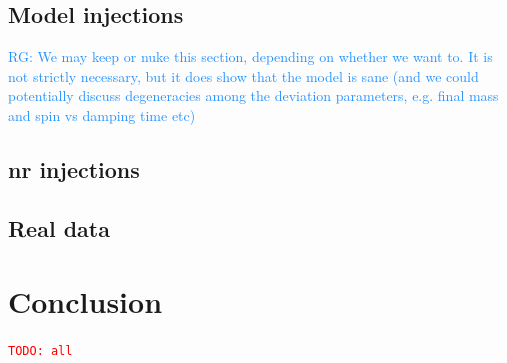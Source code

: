 \documentclass[prd,amssymb,amsmath,amsfonts,nofootinbib,reprint,showpacs,longbibliography]{revtex4-1}
\newcommand{\RG}[1]{{\textcolor{dodgerblue}{{RG: #1}} }}
\newcommand{\todo}[1]{\textcolor{red}{\texttt{TODO: #1}}}
\begin{document}
\subsection{Model injections}
\RG{We may keep or nuke this section, depending on whether we want to. It is not strictly necessary,
but it does show that the model is sane (and we could potentially discuss degeneracies among the deviation parameters,
e.g. final mass and spin vs damping time etc)}

\subsection{\ac{nr} injections}

\subsection{Real data}

\section{Conclusion}
\todo{all}


\end{document}
